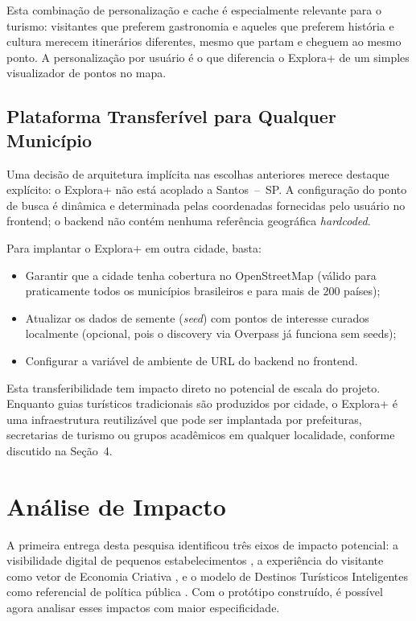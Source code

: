 \documentclass[12pt, a4paper]{article}
\begin{document}
Esta combina\c{c}\~ao de personaliza\c{c}\~ao e cache \'e especialmente relevante para o turismo: visitantes que preferem gastronomia e aqueles que preferem hist\'oria e cultura merecem itiner\'arios diferentes, mesmo que partam e cheguem ao mesmo ponto. A personaliza\c{c}\~ao por usu\'ario \'e o que diferencia o Explora+ de um simples visualizador de pontos no mapa.

\subsection{Plataforma Transfer\'ivel para Qualquer Munic\'ipio}

Uma decis\~ao de arquitetura impl\'icita nas escolhas anteriores merece destaque expl\'icito: o Explora+ n\~ao est\'a acoplado a Santos~--~SP. A configura\c{c}\~ao do ponto de busca \'e din\^amica e determinada pelas coordenadas fornecidas pelo usu\'ario no frontend; o backend n\~ao cont\'em nenhuma refer\^encia geogr\'afica \emph{hardcoded}.

Para implantar o Explora+ em outra cidade, basta:
\begin{itemize}
  \item Garantir que a cidade tenha cobertura no OpenStreetMap (v\'alido para praticamente todos os munic\'ipios brasileiros e para mais de 200 pa\'ises);
  \item Atualizar os dados de semente (\textit{seed}) com pontos de interesse curados localmente (opcional, pois o discovery via Overpass j\'a funciona sem seeds);
  \item Configurar a vari\'avel de ambiente de URL do backend no frontend.
\end{itemize}

Esta transferibilidade tem impacto direto no potencial de escala do projeto. Enquanto guias tur\'isticos tradicionais s\~ao produzidos por cidade, o Explora+ \'e uma infraestrutura reutiliz\'avel que pode ser implantada por prefeituras, secretarias de turismo ou grupos acad\^emicos em qualquer localidade, conforme discutido na Se\c{c}\~ao~4.

\clearpage
\section{An\'alise de Impacto}

A primeira entrega desta pesquisa identificou tr\^es eixos de impacto potencial: a visibilidade digital de pequenos estabelecimentos \parencite{luca2022,shankar2025}, a experi\^encia do visitante como vetor de Economia Criativa \parencite{silva2020,melo2022}, e o modelo de Destinos Tur\'isticos Inteligentes como referencial de pol\'itica p\'ublica \parencite{brasil2022}. Com o prot\'otipo constru\'ido, \'e poss\'ivel agora analisar esses impactos com maior especificidade.
\end{document}
